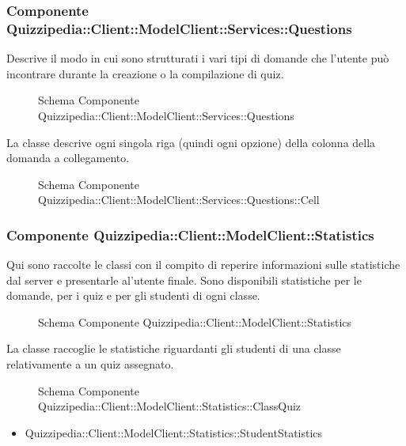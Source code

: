 \subsubsection{Componente Quizzipedia::Client::ModelClient::Services::Questions}
Descrive il modo in cui sono strutturati i vari tipi di domande che l'utente può incontrare durante la creazione o la compilazione di quiz.
\begin{figure}[H]
\centering
\noindent{}
\caption{Schema Componente Quizzipedia::Client::ModelClient::Services::Questions}
\end{figure}
La classe descrive ogni singola riga (quindi ogni opzione) della colonna della domanda a collegamento.
\begin{figure}[H]
\centering
\noindent{}
\caption{Schema Componente Quizzipedia::Client::ModelClient::Services::Questions::Cell}
\end{figure}
\subsubsection{Componente Quizzipedia::Client::ModelClient::Statistics}
Qui sono raccolte le classi con il compito di reperire informazioni sulle statistiche dal server e presentarle al'utente finale. Sono disponibili statistiche per le domande, per i quiz e per gli studenti di ogni classe.
\begin{figure}[H]
\centering
\noindent{}
\caption{Schema Componente Quizzipedia::Client::ModelClient::Statistics}
\end{figure}
La classe raccoglie le statistiche riguardanti gli studenti di una classe relativamente a un quiz assegnato.
\begin{figure}[H]
\centering
\noindent{}
\caption{Schema Componente Quizzipedia::Client::ModelClient::Statistics::ClassQuiz}
\end{figure}
\begin{itemize}
\item Quizzipedia::Client::ModelClient::Statistics::StudentStatistics
\end{itemize}
